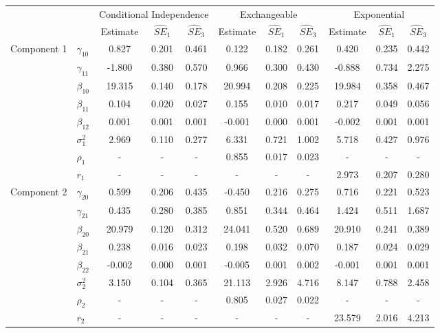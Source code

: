\documentclass[10pt]{article}
\begin{document}
\begin{table}[ht]
\begin{center}
\begin{tabular}{llccccccccc}
  \hline&&\multicolumn{3}{c}{Conditional Independence}&\multicolumn{3}{c}{Exchangeable}&\multicolumn{3}{c}{Exponential}\\&&Estimate&$\widehat{SE}_1$&$\widehat{SE}_3$&Estimate&$\widehat{SE}_1$&$\widehat{SE}_3$&Estimate&$\widehat{SE}_1$&$\widehat{SE}_3$\\\hline Component 1 & $\gamma_{10}$ & 0.827 & 0.201 & 0.461 & 0.122 & 0.182 & 0.261 & 0.420 & 0.235 & 0.442 \\ 
    & $\gamma_{11}$ & -1.800 & 0.380 & 0.570 & 0.966 & 0.300 & 0.430 & -0.888 & 0.734 & 2.275 \\ 
    & $\beta_{10}$ & 19.315 & 0.140 & 0.178 & 20.994 & 0.208 & 0.225 & 19.984 & 0.358 & 0.467 \\ 
    & $\beta_{11}$ & 0.104 & 0.020 & 0.027 & 0.155 & 0.010 & 0.017 & 0.217 & 0.049 & 0.056 \\ 
    & $\beta_{12}$ & 0.001 & 0.001 & 0.001 & -0.001 & 0.000 & 0.001 & -0.002 & 0.001 & 0.001 \\ 
    & $\sigma_1^2$ & 2.969 & 0.110 & 0.277 & 6.331 & 0.721 & 1.002 & 5.718 & 0.427 & 0.976 \\ 
    & $\rho_1$ & - & - & - & 0.855 & 0.017 & 0.023 & - & - & - \\ 
    & $r_1$ & - & - & - & - & - & - & 2.973 & 0.207 & 0.280 \\ 
  Component 2 & $\gamma_{20}$ & 0.599 & 0.206 & 0.435 & -0.450 & 0.216 & 0.275 & 0.716 & 0.221 & 0.523 \\ 
    & $\gamma_{21}$ & 0.435 & 0.280 & 0.385 & 0.851 & 0.344 & 0.464 & 1.424 & 0.511 & 1.687 \\ 
    & $\beta_{20}$ & 20.979 & 0.120 & 0.312 & 24.041 & 0.520 & 0.689 & 20.910 & 0.241 & 0.389 \\ 
    & $\beta_{21}$ & 0.238 & 0.016 & 0.023 & 0.198 & 0.032 & 0.070 & 0.187 & 0.024 & 0.029 \\ 
    & $\beta_{22}$ & -0.002 & 0.000 & 0.001 & -0.005 & 0.001 & 0.002 & -0.001 & 0.001 & 0.001 \\ 
    & $\sigma_2^2$ & 3.150 & 0.104 & 0.365 & 21.113 & 2.926 & 4.716 & 8.147 & 0.788 & 2.458 \\ 
    & $\rho_2$ & - & - & - & 0.805 & 0.027 & 0.022 & - & - & - \\ 
    & $r_2$ & - & - & - & - & - & - & 23.579 & 2.016 & 4.213 \\ 

\end{tabular}
\end{center}
\end{table}
\end{document}
